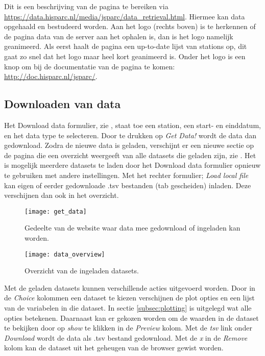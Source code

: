 Dit is een beschrijving van de pagina te bereiken via
\url{https://data.hisparc.nl/media/jsparc/data_retrieval.html}. Hiermee
kan data opgehaald en bestudeerd worden. Aan het \hisparc logo (rechts
boven) is te herkennen of de pagina data van de \hisparc server aan het
ophalen is, dan is het logo namelijk geanimeerd. Als eerst haalt de
pagina een up-to-date lijst van \hisparc stations op, dit gaat zo snel
dat het logo maar heel kort geanimeerd is. Onder het logo is een knop om bij
de documentatie van de pagina te komen: \url{http://doc.hisparc.nl/jsparc/}.


\subsection{Downloaden van data}

Het Download data formulier, zie , staat toe
een \hisparc station, een start- en einddatum, en het data type te
selecteren. Door te drukken op \emph{Get Data!} wordt de data dan
gedownload. Zodra de nieuwe data is geladen, verschijnt er een nieuwe
sectie op de pagina die een overzicht weergeeft van alle datasets die
geladen zijn, zie . Het is mogelijk meerdere
datasets te laden door het Download data formulier opnieuw te gebruiken
met andere instellingen. Met het rechter formulier; \emph{Load local
file} kan eigen of eerder gedownloade .tsv bestanden (tab
gescheiden) inladen. Deze verschijnen dan ook in het overzicht.

\begin{figure}
    \centering
    \texttt{[image: get\_data]}
    \caption{Gedeelte van de website waar data mee gedownload of
             ingeladen kan worden.}
    \label{fig:get_data}
\end{figure}

\begin{figure}
    \centering
    \texttt{[image: data\_overview]}
    \caption{Overzicht van de ingeladen datasets.}
    \label{fig:data_overview}
\end{figure}

Met de geladen datasets kunnen verschillende acties uitgevoerd worden.
Door in de \emph{Choice} kolommen een dataset te kiezen verschijnen de
plot opties en een lijst van de variabelen in die dataset. In sectie
\ref{subsec:plotting} is uitgelegd wat alle opties betekenen. Daarnaast
kan er gekozen worden om de waarden in de dataset te bekijken door op
\emph{show} te klikken in de \emph{Preview} kolom. Met de \emph{tsv}
link onder \emph{Download} wordt de data als .tsv bestand gedownload.
Met de \emph{x} in de \emph{Remove} kolom kan de dataset uit het geheugen
van de browser gewist worden.


